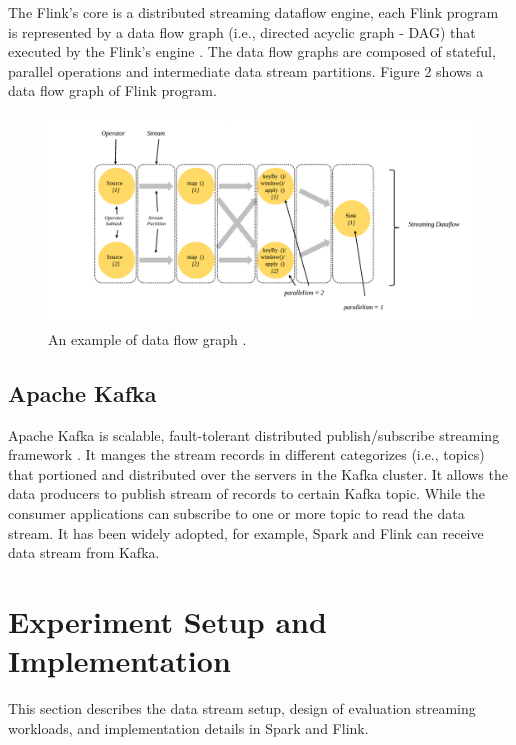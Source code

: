 \documentclass[]{article}
\begin{document}
\par The Flink's core is a distributed streaming dataflow engine,  each Flink program is represented by a data flow graph (i.e., directed acyclic graph - DAG) that executed by the Flink's engine \cite{flink_paper}. The data flow graphs are composed of stateful, parallel operations and intermediate data stream partitions. Figure 2 shows a data flow graph of Flink program.


\begin{figure}[h]
 
  \centering
    \includegraphics[width=\textwidth, height=.4\textheight]{flink_engine.png}
     \caption{ An example of data flow graph \cite{flink}.}
\end{figure} 
\subsection{Apache Kafka}
\par Apache Kafka is scalable, fault-tolerant distributed publish/subscribe streaming framework \cite{kafka}.
It manges the stream records in different categorizes (i.e., topics) that portioned and distributed over the servers in the Kafka cluster. It allows the data producers to publish stream of records to certain Kafka topic. While the consumer applications can subscribe to one or more topic to read the data stream. It has been widely  adopted, for example, 
Spark and Flink can receive data stream from Kafka. 


\section{Experiment Setup and Implementation}
This section describes the data stream setup, design of evaluation streaming workloads, and implementation details in Spark and Flink.
\end{document}
